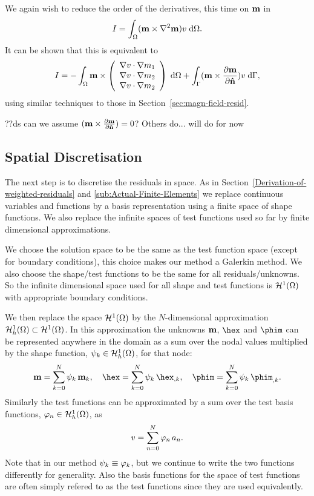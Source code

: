 We again wish to reduce the order of the derivatives, this time on $\mathbf{m}$ in
\begin{equation}
 I = \int_\Omega (\mathbf{m} \times \nabla^2 \mathbf{m}) v {\; \text{d}}\Omega.
 \label{eq:46}
\end{equation}
It can be shown that this is equivalent to
\begin{equation}
  \label{eq:49}
  I = - \int_\Omega  \mathbf{m} \times \left( \begin{array}{c} \nabla v \cdot \nabla m_1 \\ \nabla v \cdot \nabla m_2 \\ \nabla v \cdot \nabla m_2 \end{array} \right) {\; \text{d}}\Omega + \int_{\Gamma} (\mathbf{m} \times \frac{\partial \mathbf{m}}{\partial \mathbf{\hat{n}}}) v {\; \text{d}}{\Gamma},
\end{equation}
using similar techniques to those in Section~\ref{sec:magn-field-resid}. %

??ds can we assume $(\mathbf{m} \times \frac{\partial \mathbf{m}}{\partial \mathbf{\hat{n}}}) = 0$? Others do... will do for now

\subsection{Spatial Discretisation}
\label{sec:spat-discr-resi}

The next step is to discretise the residuals in space. As in Section~\ref{Derivation-of-weighted-residuals} and \ref{sub:Actual-Finite-Elements} we replace continuous variables and functions by a basis representation using a finite space of shape functions. We also replace the infinite spaces of test functions used so far by finite dimensional approximations.

We choose the solution space to be the same as the test function space (except for boundary conditions), this choice makes our method a Galerkin method. We also choose the shape/test functions to be the same for all residuals/unknowns. So the infinite dimensional space used for all shape and test functions is $\mathcal{H}^1(\Omega)$ with appropriate boundary conditions.

We then replace the space $\mathcal{H}^1(\Omega)$ by the $N$-dimensional approximation ${\mathcal{H}^1_h(\Omega)} \subset \mathcal{H}^1(\Omega)$. In this approximation the unknowns $\mathbf{m}$, $\hex$ and $\phim$ can be represented anywhere in the domain as a sum over the nodal values multiplied by the shape function, ${\psi_k} \in {\mathcal{H}^1_h(\Omega)}$, for that node:
\begin{gather} %
  \mv = \sum_{k = 0}^{N} \sk \, \mv_k, \quad
  \hex = \sum_{k = 0}^{N} \sk \, \hex_{,k}, \quad
  \phim = \sum_{k = 0}^{N} \sk \, \phim_{,k}.
  \label{eq:unknowns-basis}
\end{gather}
Similarly the test functions can be approximated by a sum over the test basis functions, ${\varphi_n} \in {\mathcal{H}^1_h(\Omega)}$, as
\begin{equation}
  \label{eq:47}
  v = \sum_{n = 0}^{N} {\varphi_n} \, a_n.
\end{equation}
Note that in our method $\psi_k \equiv \varphi_k$, but we continue to write the two functions differently for generality. Also the basis functions for the space of test functions are often simply refered to as the test functions since they are used equivalently.

